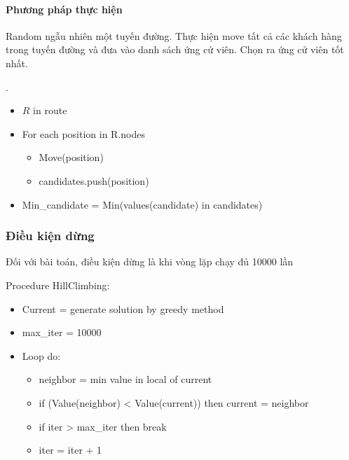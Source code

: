 \documentclass[12pt,a4paper]{article}\author{Nguyễn Nho Dũng}
\begin{document}
\paragraph{Phương pháp thực hiện} Random ngẫu nhiên một tuyến đường. Thực hiện move tất cả các khách hàng trong tuyến đường và đưa vào danh sách ứng cử viên. Chọn ra ứng cử viên tốt nhất.
\begin{thuattoan}
	.
	\begin{itemize}
		\item $R$ in route
		\item For each position in R.nodes
		\begin{itemize}
			\item Move(position)
			\item candidates.push(position)
		\end{itemize}
		\item Min\_candidate = Min(values(candidate) in candidates)
	\end{itemize}
\end{thuattoan}
\subsubsection{Điều kiện dừng}
Đối với bài toán, điều kiện dừng là khi vòng lặp chạy đủ 10000 lần
\begin{thuattoan}
	Procedure HillClimbing:
	\begin{itemize}
		\item Current = generate solution by greedy method
  \item max\_iter = 10000
		\item Loop do:
		\begin{itemize}
			\item neighbor = min value in local of current
			\item if (Value(neighbor) < Value(current)) then current = neighbor
                \item if iter > max\_iter then break
                \item iter = iter + 1
		\end{itemize}
	\end{itemize}
\end{thuattoan}
\end{document}
